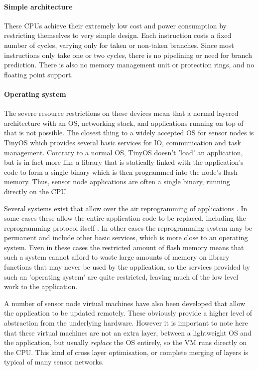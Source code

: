 \paragraph{Simple architecture}
These CPUs achieve their extremely low cost and power consumption by restricting themselves to very simple design. Each instruction costs a fixed number of cycles, varying only for taken or non-taken branches. Since most instructions only take one or two cycles, there is no pipelining or need for branch prediction. There is also no memory management unit or protection rings, and no floating point support.

\paragraph{Operating system}
The severe resource restrictions on these devices mean that a normal layered architecture with an OS, networking stack, and applications running on top of that is not possible. The closest thing to a widely accepted OS for sensor nodes is TinyOS \cite{Levis:2004ws} which provides several basic services for IO, communication and task management. Contrary to a normal OS, TinyOS doesn't 'load' an application, but is in fact more like a library that is statically linked with the application's code to form a single binary which is then programmed into the node's flash memory. Thus, sensor node applications are often a single binary, running directly on the CPU.

Several systems exist that allow over the air reprogramming of applications \cite{Quadri:2014wr}. In some cases these allow the entire application code to be replaced, including the reprogramming protocol itself \cite{Reijers:2003ww}. In other cases the reprogramming system may be permanent and include other basic services, which is more close to an operating system. Even in these cases the restricted amount of flash memory means that such a system cannot afford to waste large amounts of memory on library functions that may never be used by the application, so the services provided by such an 'operating system' are quite restricted, leaving much of the low level work to the application.

A number of sensor node virtual machines have also been developed that allow the application to be updated remotely. These obviously provide a higher level of abstraction from the underlying hardware. However it is important to note here that these virtual machines are not an extra layer, between a lightweight OS and the application, but usually \emph{replace} the OS entirely, so the VM runs directly on the CPU. This kind of cross layer optimisation, or complete merging of layers is typical of many sensor networks.

